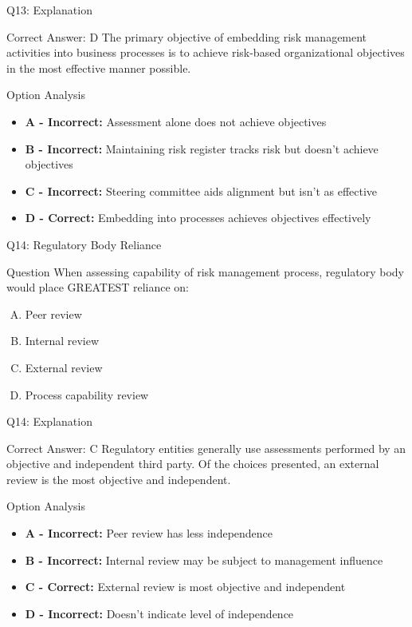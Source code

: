 \documentclass{beamer}
\begin{document}
	\begin{frame}{Q13: Explanation}
		\begin{block}{Correct Answer: D}
			The primary objective of embedding risk management activities into business processes is to achieve risk-based organizational objectives in the most effective manner possible.
		\end{block}
		\begin{block}{Option Analysis}
			\begin{itemize}
				\item \textbf{A - Incorrect:} Assessment alone does not achieve objectives
				\item \textbf{B - Incorrect:} Maintaining risk register tracks risk but doesn't achieve objectives
				\item \textbf{C - Incorrect:} Steering committee aids alignment but isn't as effective
				\item \textbf{D - Correct:} Embedding into processes achieves objectives effectively
			\end{itemize}
		\end{block}
	\end{frame}
	
	\begin{frame}{Q14: Regulatory Body Reliance}
		\begin{block}{Question}
			When assessing capability of risk management process, regulatory body would place GREATEST reliance on:
		\end{block}
		\begin{enumerate}[(A)]
			\item Peer review
			\item Internal review
			\item External review
			\item Process capability review
		\end{enumerate}
	\end{frame}
	
	\begin{frame}{Q14: Explanation}
		\begin{block}{Correct Answer: C}
			Regulatory entities generally use assessments performed by an objective and independent third party. Of the choices presented, an external review is the most objective and independent.
		\end{block}
		\begin{block}{Option Analysis}
			\begin{itemize}
				\item \textbf{A - Incorrect:} Peer review has less independence
				\item \textbf{B - Incorrect:} Internal review may be subject to management influence
				\item \textbf{C - Correct:} External review is most objective and independent
				\item \textbf{D - Incorrect:} Doesn't indicate level of independence
			\end{itemize}
		\end{block}
	\end{frame}
	
\end{document}
